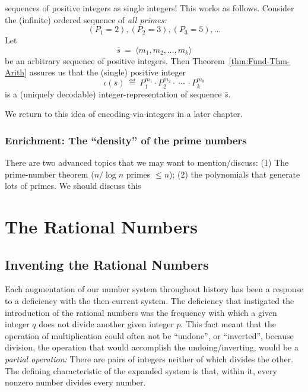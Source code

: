 sequences of positive integers as single integers!  This works as
follows.  Consider the (infinite) ordered sequence of {\em all primes:}
\[ (P_1 = 2), (P_2 = 3), (P_3 = 5), \ldots  \]
Let
\begin{equation}
\label{eq:sequence-vec-s}
\bar{s} \ = \ \langle m_1, m_2, \ldots, m_k \rangle
\end{equation}
be an arbitrary sequence of positive integers.  Then
Theorem~\ref{thm:Fund-Thm-Arith} assures us that the (single) positive
integer
\[ 
\iota(\bar{s}) \ \eqdef \ P_1^{m_1} \cdot P_2^{m_2} \cdot \ \cdots \
\cdot P_k^{m_k}
\]
is a (uniquely decodable) integer-representation of sequence $\bar{s}$.

We return to this idea of encoding-via-integers in a later chapter.

\subsubsection{{\bf Enrichment}: The ``density'' of the prime numbers}
\label{sec:Prime-Number-Theorem}

{\Arny There are two advanced topics that we may want to
  mention/discuss: (1) The prime-number theorem ($n/ \log n$ primes
  $\leq n$); (2) the polynomials that generate lots of primes.  We
  should discuss this}


\section{The Rational Numbers}
\label{sec:rationals}

\subsection{Inventing the Rational Numbers}

Each augmentation of our number system throughout history has been a
response to a deficiency with the then-current system.  The deficiency
that instigated the introduction of the rational numbers was the
frequency with which a given integer $q$ does not divide another given
integer $p$.  This fact meant that the operation of multiplication
could often not be ``undone'', or ``inverted'', because division, the
operation that would accomplish the undoing/inverting, would be a {\em
  partial operation:} There are pairs of integers neither of which
divides the other.  The defining characteristic of the expanded system
is that, within it, every nonzero number divides every number.


